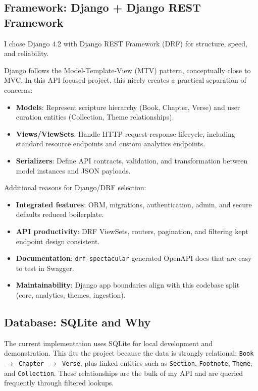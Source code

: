 \documentclass[11pt,a4paper]{article}
\begin{document}
\subsection{Framework: Django + Django REST Framework}
I chose Django 4.2 with Django REST Framework (DRF) for structure, speed, and reliability.

Django follows the Model-Template-View (MTV) pattern, conceptually close to MVC. In this API focused project, this nicely creates a practical separation of concerns:
\begin{itemize}[leftmargin=*]
	\item \textbf{Models}: Represent scripture hierarchy (Book, Chapter, Verse) and user curation entities (Collection, Theme relationships).
	\item \textbf{Views/ViewSets}: Handle HTTP request-response lifecycle, including standard resource endpoints and custom analytics endpoints.
	\item \textbf{Serializers}: Define API contracts, validation, and transformation between model instances and JSON payloads.
\end{itemize}

Additional reasons for Django/DRF selection:
\begin{itemize}[leftmargin=*]
	\item \textbf{Integrated features}: ORM, migrations, authentication, admin, and secure defaults reduced boilerplate.
	\item \textbf{API productivity}: DRF ViewSets, routers, pagination, and filtering kept endpoint design consistent.
	\item \textbf{Documentation}: \texttt{drf-spectacular} generated OpenAPI docs that are easy to test in Swagger.
	\item \textbf{Maintainability}: Django app boundaries align with this codebase split (core, analytics, themes, ingestion).
\end{itemize}

\subsection{Database: SQLite and Why}
The current implementation uses SQLite for local development and demonstration. This fits the project because the data is strongly relational: \texttt{Book $\rightarrow$ Chapter $\rightarrow$ Verse}, plus linked entities such as \texttt{Section}, \texttt{Footnote}, \texttt{Theme}, and \texttt{Collection}. These relationships are the bulk of my API and are queried frequently through filtered lookups.
\end{document}

